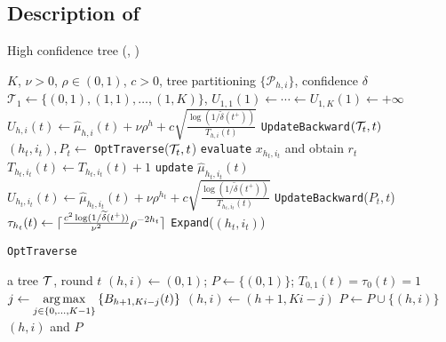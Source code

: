 \subsection{Description of \HCT}
\begin{algorithm}[ht]
\centering
\caption{High confidence tree (\HCT, \citealt{azar2014online})}
\label{alg:hct}
\begin{algorithmic}[1]
     $K$, $\nu>0$, $\rho\in(0,1)$, $c>0$, tree partitioning $\{\mathcal{P}_{h,i}\}$, confidence $\delta$
     $\mathcal{T}_1 \gets \{(0,1),(1,1),\ldots,(1,K)\}$, $U_{1,1}(1) \gets \cdots \gets U_{1,K}(1) \gets +\infty$
                \State $U_{h,i}(t) \gets \hat{\mu}_{h,i}(t) + \nu\rho^{h} + c\sqrt{\frac{\operatorname{log}\left(1/\tilde{\delta}(t^+)\right)}{T_{h,i}(t)}}$
            \EndFor
            \State \texttt{UpdateBackward}$(\mathcal{T}_t, t)$
        \EndIf
        \State $(h_t,i_t),P_t \gets$ \texttt{OptTraverse}($\mathcal{T}_t, t$)
        \State \texttt{evaluate} $x_{h_t,i_t}$ and obtain $r_t$
        \State $T_{h_t,i_t}(t) \gets T_{h_t,i_t}(t)+1$
        \State \texttt{update} $\hat{\mu}_{h_t,i_t}(t)$
        \State $U_{h_t,i_t}(t) \gets \hat{\mu}_{h_t,i_t}(t) + \nu\rho^{h_t} + c\sqrt{\frac{\operatorname{log}\left(1/\tilde{\delta}(t^+)\right)}{T_{h_t,i_t}(t)}}$
        \State \texttt{UpdateBackward}($P_t, t$)
        \State $\tau_{h_t}(t) \gets \lceil\frac{c^2\operatorname{log}(1/\widetilde{\delta}(t^+))}{\nu^2}\rho^{-2h_t}\rceil$
            \State \texttt{Expand}($(h_t,i_t)$)
        \EndIf
    \EndFor
\end{algorithmic}
\end{algorithm}

\begin{algorithm}[ht]
\centering
\caption{\texttt{OptTraverse}
\label{alg:hct_opt}}
\begin{algorithmic}[1]
     a tree $\mathcal{T}$, round $t$
     $(h,i)\leftarrow (0,1)$; $P\leftarrow \{(0,1)\}$; $T_{0,1}(t)=\tau_0(t)=1$
        \State $j \gets \underset{j\in\{0,\ldots,K-1\}}{\operatorname*{arg\,max}} \left\{B_{h+1,Ki-j}(t)\right\}$
        \State $(h,i) \gets (h+1,Ki-j)$
        \State $P\leftarrow P\cup\{(h,i)\}$
    \EndWhile
     $(h,i)$ and $P$
\end{algorithmic}
\end{algorithm}

